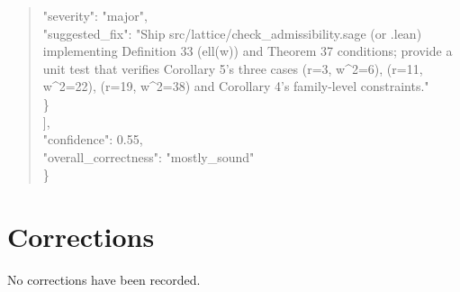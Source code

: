 \documentclass[11pt]{article}
\begin{document}
\begin{quote}
      "severity": "major",\\
      "suggested\_fix": "Ship src/lattice/check\_admissibility.sage (or .lean) implementing Definition 33 (ell(w)) and Theorem 37 conditions; provide a unit test that verifies Corollary 5's three cases (r=3, w\^{}2=6), (r=11, w\^{}2=22), (r=19, w\^{}2=38) and Corollary 4's family-level constraints."\\
    \}\\
  ],\\
  "confidence": 0.55,\\
  "overall\_correctness": "mostly\_sound"\\
\}\\
\end{quote}

\section*{Corrections}
No corrections have been recorded.
\end{document}
